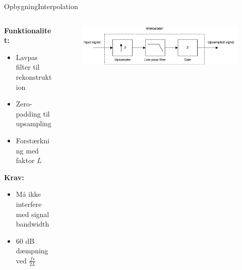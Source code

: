 \begin{frame}{Opbygning}{Interpolation}

\begin{columns}
  \begin{column}{0.4\textwidth}
  \textbf{Funktionalitet:}
\begin{itemize}
\item Lavpas filter til rekonstruktion
\item Zero-padding til upsampling
\item Forstærkning med faktor $L$
\end{itemize}
\textbf{Krav:}
\begin{itemize}
\item Må ikke interfere med signal bandwidth
\item \alert{60 dB dæmpning ved $\frac{fs}{2L}$}
\end{itemize}
  \end{column}

  \begin{column}{0.6\textwidth}
\begin{figure}
\centering
\includegraphics[width=\textwidth]{designRealInterpolator}
\end{figure}


  \end{column}
\end{columns}

\end{frame}


